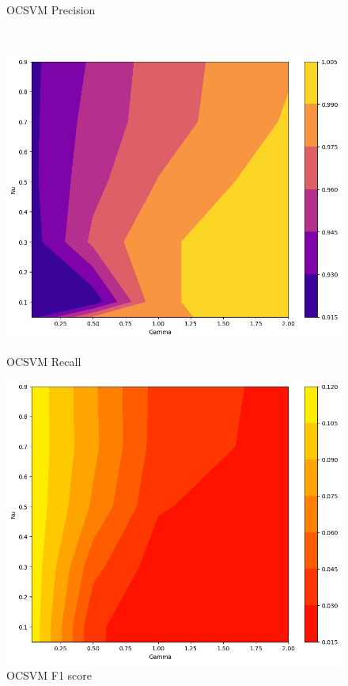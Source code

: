 \begin{figure}[p]
\begin{minipage}[t]{0.5\textwidth}
        \caption{OCSVM Precision}
    \end{minipage}
    \\
    \begin{minipage}[t]{0.5\textwidth}
        \vspace{0pt}
        \includegraphics[width=\textwidth]{images/ocsvm-recall.png}
        \caption{OCSVM Recall}
    \end{minipage}
    \hfill
    \begin{minipage}[t]{0.5\textwidth}
        \vspace{0pt}
        \includegraphics[width=\textwidth]{images/ocsvm-f1-score.png}
        \caption{OCSVM F1 score}
    \end{minipage}
\end{figure}

